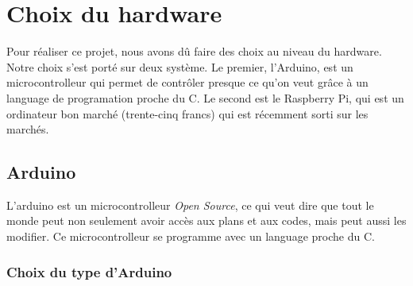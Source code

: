 \documentclass[a4paper,12pt]{article}
\begin{document}
{\section*{Choix du hardware}
Pour réaliser ce projet, nous avons dû faire des choix au niveau du hardware. Notre choix s'est porté sur deux système. Le premier, l'Arduino, est un microcontrolleur qui permet de contrôler presque ce qu'on veut grâce à un language de programation proche du C. Le second est le Raspberry Pi, qui est un ordinateur bon marché (trente-cinq francs) qui est récemment sorti sur les marchés. 


\subsection*{Arduino}
L'arduino est un microcontrolleur \textit{Open Source}, ce qui veut dire que tout le monde peut non seulement avoir accès aux plans et aux codes, mais peut aussi les modifier. Ce microcontrolleur se programme avec un language proche du C. 


\subsubsection*{Choix du type d'Arduino}



}
\end{document}
